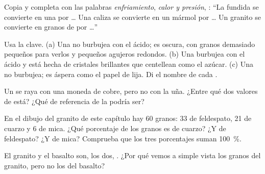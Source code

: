 \begin{exercise}[$\star$]\label{exo:g6:rocks-and-minerals:4}
Copia y completa con las palabras \emph{enfriamiento}, \emph{calor y
presión}, \emph{}: ``La  fundida se convierte en una  por \ldots{} Una caliza se convierte en un mármol por \ldots{} Un
granito se convierte en granos de  por \ldots''
\end{exercise}

\begin{exercise}[$\star\star$]\label{exo:g6:rocks-and-minerals:5}
Usa la clave. (a) Una  no burbujea con el ácido; es oscura, con granos
demasiado pequeños para verlos y pequeños agujeros redondos. (b) Una 
burbujea con el ácido y está hecha de cristales brillantes que centellean
como el azúcar. (c) Una  no burbujea; es áspera como el papel de lija.
Di el nombre de cada .
\end{exercise}

\begin{exercise}[$\star\star$]\label{exo:g6:rocks-and-minerals:6}
Un  se raya con una moneda de cobre, pero no con la uña. ¿Entre qué
dos valores de  está? ¿Qué  de referencia de la 
podría ser?
\end{exercise}

\begin{exercise}[$\star\star$]\label{exo:g6:rocks-and-minerals:7}
En el dibujo del granito de este capítulo hay 60 granos: 33 de feldespato,
21 de cuarzo y 6 de mica. ¿Qué porcentaje de los granos es de cuarzo? ¿Y de
feldespato? ¿Y de mica? Comprueba que los tres porcentajes suman
100~\%.
\end{exercise}

\begin{exercise}[$\star\star$]\label{exo:g6:rocks-and-minerals:8}
El granito y el basalto son, los dos, . ¿Por qué vemos a simple
vista los granos del granito, pero no los del basalto?
\end{exercise}

